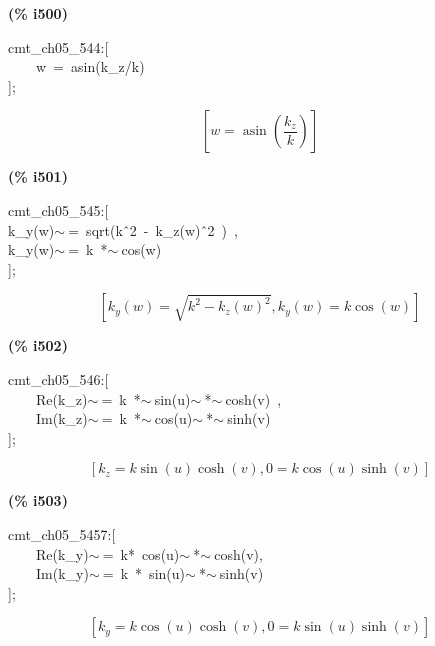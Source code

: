 \documentclass[fleqn]{article}
\begin{document}
\noindent
\begin{minipage}[t]{4.000000em}\color{red}\bfseries
(\% i500)	
\end{minipage}
\begin{minipage}[t]{\textwidth}\color{blue}
cmt\_ch05\_544:[\\
\ \ \ \ w\ =\ asin(k\_z/k)\\
];
\end{minipage}
\[\displaystyle \tag{\% o500} 
\left[ w=\operatorname{asin}\left( \frac{{k_z}}{k}\right) \right] \mbox{}
\]


\noindent
\begin{minipage}[t]{4.000000em}\color{red}\bfseries
(\% i501)	
\end{minipage}
\begin{minipage}[t]{\textwidth}\color{blue}
cmt\_ch05\_545:[\\
k\_y(w)\ensuremath{\sim\ }=\ sqrt(k\^\ 2\ -\ k\_z(w)\^\ 2\ )\ ,\\
k\_y(w)\ensuremath{\sim\ }=\ k\ *\ensuremath{\sim\ }cos(w)\\
];
\end{minipage}
\[\displaystyle \tag{\% o501} 
\left[ {k_y}(w)=\sqrt{{{k}^{2}}-{{{k_z}(w)}^{2}}}\operatorname{,}{k_y}(w)=k \cos{(w)}\right] \mbox{}
\]


\noindent
\begin{minipage}[t]{4.000000em}\color{red}\bfseries
(\% i502)	
\end{minipage}
\begin{minipage}[t]{\textwidth}\color{blue}
cmt\_ch05\_546:[\\
\ \ \ \ Re(k\_z)\ensuremath{\sim\ }=\ k\ *\ensuremath{\sim\ }sin(u)\ensuremath{\sim\ }*\ensuremath{\sim\ }cosh(v)\ ,\ \\
\ \ \ \ Im(k\_z)\ensuremath{\sim\ }=\ k\ *\ensuremath{\sim\ }cos(u)\ensuremath{\sim\ }*\ensuremath{\sim\ }sinh(v)\\
];
\end{minipage}
\[\displaystyle \tag{\% o502} 
\left[ {k_z}=k \sin{(u)} \cosh{(v)}\operatorname{,}0=k \cos{(u)} \sinh{(v)}\right] \mbox{}
\]


\noindent
\begin{minipage}[t]{4.000000em}\color{red}\bfseries
(\% i503)	
\end{minipage}
\begin{minipage}[t]{\textwidth}\color{blue}
cmt\_ch05\_5457:[\\
\ \ \ \ Re(k\_y)\ensuremath{\sim\ }=\ k*\ cos(u)\ensuremath{\sim\ }*\ensuremath{\sim\ }cosh(v),\\
\ \ \ \ Im(k\_y)\ensuremath{\sim\ }=\ k\ *\ sin(u)\ensuremath{\sim\ }*\ensuremath{\sim\ }sinh(v)\\
];
\end{minipage}
\[\displaystyle \tag{\% o503} 
\left[ {k_y}=k \cos{(u)} \cosh{(v)}\operatorname{,}0=k \sin{(u)} \sinh{(v)}\right] \mbox{}
\]
\end{document}
